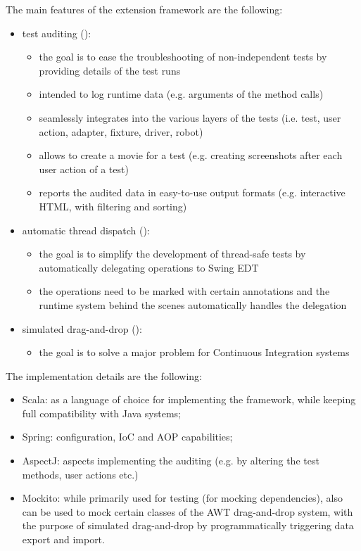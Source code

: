 \noindent The main features of the extension framework are the following:
\begin{itemize}
\item test auditing ():
	\begin{itemize}
	\item the goal is to ease the troubleshooting of non-independent tests by providing details of the test runs
	\item intended to log runtime data (e.g. arguments of the method calls)
	\item seamlessly integrates into the various layers of the tests (i.e. test, user action, adapter, fixture, driver, robot)
	\item allows to create a movie for a test (e.g. creating screenshots after each user action of a test)
	\item reports the audited data in easy-to-use output formats (e.g. interactive HTML, with filtering and sorting)
	\end{itemize}
\end{itemize}

\begin{itemize}
\item automatic thread dispatch ():
	\begin{itemize}
	\item the goal is to simplify the development of thread-safe tests by automatically delegating operations to Swing EDT
	\item the operations need to be marked with certain annotations and the runtime system behind the scenes automatically handles the delegation
	\end{itemize}

\item simulated drag-and-drop ():
	\begin{itemize}
	\item the goal is to solve a major problem for Continuous Integration systems
	\end{itemize}
\end{itemize}

\noindent The implementation details are the following:

\begin{itemize}
\item Scala: as a language of choice for implementing the framework, while keeping full compatibility with Java systems;
\item Spring: configuration, IoC and AOP capabilities;
\item AspectJ: aspects implementing the auditing (e.g. by altering the test methods, user actions etc.)
\item Mockito: while primarily used for testing (for mocking dependencies), also can be used to mock certain classes of the AWT drag-and-drop system, with the purpose of simulated drag-and-drop by programmatically triggering data export and import.
\end{itemize}
